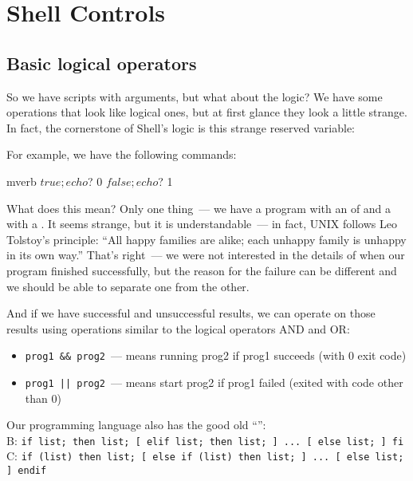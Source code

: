 \section*{Shell Controls}

\subsection*{Basic logical operators} %

So we have scripts with arguments, but what about the logic? We have some
operations that look like logical ones, but at first glance they look
a little strange. In fact, the cornerstone of Shell's logic is this strange
reserved variable:
For example, we have the following commands:
\begin{code}{mverb}
$ true; echo $?
0
$ false; echo $?
1
\end{code} %
What does this mean? Only one thing~--- we have a  program
with an  of  and a  with
a . It seems strange, but it is understandable~---
in fact, UNIX follows Leo Tolstoy's principle: ``All happy families are alike;
each unhappy family is unhappy in its own way.'' That's right~--- we were not
interested in the details of when our program finished successfully,
but the reason for the failure can be different and we should be able
to separate one from the other.

And if we have successful and unsuccessful results, we can operate on those
results using operations similar to the logical operators AND and OR:
\begin{itemize}
\item \verb|prog1 && prog2|~--- means running prog2 if prog1 succeeds
      (with 0 exit code)
\item \verb!prog1 || prog2!~--- means start prog2 if prog1 failed
      (exited with code other than 0)
\end{itemize}

Our programming language also has the good old ``'':\\
B: {\tt if list; then list; [ elif list; then list; ] ... [ else list; ] fi}\\
C: {\tt if (list) then list; [ else if (list) then list; ] ... [ else list; ] endif}


